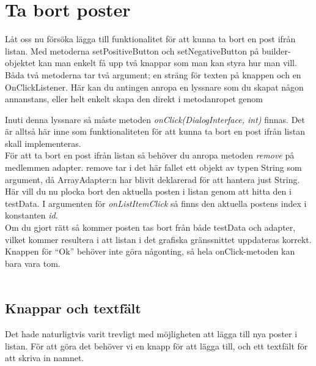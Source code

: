 \documentclass[11 pt, titlepage]{article} %
\begin{document}
\section{Ta bort poster}
Låt oss nu försöka lägga till funktionalitet för att kunna ta bort en post ifrån listan. 
Med metoderna setPositiveButton och setNegativeButton på builder-objektet kan man enkelt få upp två knappar som man kan styra hur man vill. Båda två metoderna tar två argument; en sträng för texten på knappen och en OnClickListener.
Här kan du antingen anropa en lyssnare som du skapat någon annanstans, eller helt enkelt skapa den direkt i metodanropet genom 


Inuti denna lyssnare så måste metoden \textit{onClick(DialogInterface, int)} finnas. Det är alltså här inne som funktionaliteten för att kunna ta bort en post ifrån listan skall implementeras.\\

För att ta bort en post ifrån listan så behöver du anropa metoden \textit{remove} på medlemmen adapter. remove tar i det här fallet ett objekt av typen String som argument, då ArrayAdapter:n har blivit deklarerad för att hantera just String. Här vill du nu plocka bort den aktuella posten i listan genom att hitta den i testData.
I argumenten för \textit{onListItemClick} så finns den aktuella postens index i konstanten \textit{id}.\\  
Om du gjort rätt så kommer posten tas bort från både testData och adapter, vilket kommer resultera i att listan i det grafiska gränssnittet uppdateras korrekt.\\

Knappen för “Ok” behöver inte göra någonting, så hela onClick-metoden kan bara vara tom.\\ \\


\subsection{Knappar och textfält}
Det hade naturligtvis varit trevligt med möjligheten att lägga till nya poster i listan. För att göra det behöver vi en knapp för att lägga till, och ett textfält för att skriva in namnet.\\
\end{document}
